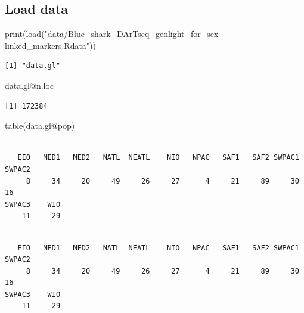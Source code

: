 \documentclass[
  letterpaper,
  DIV=11,
  numbers=noendperiod]{scrreprt}
\newenvironment{Shaded}{\begin{snugshade}}{\end{snugshade}}
\newcommand{\FunctionTok}[1]{\textcolor[rgb]{0.02,0.16,0.49}{#1}}
\newcommand{\NormalTok}[1]{\textcolor[rgb]{0.00,0.44,0.13}{#1}}
\newcommand{\SpecialCharTok}[1]{\textcolor[rgb]{0.25,0.44,0.63}{#1}}
\newcommand{\StringTok}[1]{\textcolor[rgb]{0.25,0.44,0.63}{#1}}
\begin{document}
\hypertarget{load-data-4}{%
\subsection*{Load data}\label{load-data-4}}

\begin{Shaded}
\begin{Highlighting}[]
\FunctionTok{print}\NormalTok{(}\FunctionTok{load}\NormalTok{(}\StringTok{"data/Blue\_shark\_DArTseq\_genlight\_for\_sex{-}linked\_markers.Rdata"}\NormalTok{))}
\end{Highlighting}
\end{Shaded}

\begin{verbatim}
[1] "data.gl"
\end{verbatim}

\begin{Shaded}
\begin{Highlighting}[]
\NormalTok{data.gl}\SpecialCharTok{@}\NormalTok{n.loc}
\end{Highlighting}
\end{Shaded}

\begin{verbatim}
[1] 172384
\end{verbatim}

\begin{Shaded}
\begin{Highlighting}[]
\FunctionTok{table}\NormalTok{(data.gl}\SpecialCharTok{@}\NormalTok{pop)}
\end{Highlighting}
\end{Shaded}

\begin{verbatim}

   EIO   MED1   MED2   NATL  NEATL    NIO   NPAC   SAF1   SAF2 SWPAC1 SWPAC2 
     8     34     20     49     26     27      4     21     89     30     16 
SWPAC3    WIO 
    11     29 
\end{verbatim}

\begin{Shaded}
\end{Shaded}

\begin{verbatim}

   EIO   MED1   MED2   NATL  NEATL    NIO   NPAC   SAF1   SAF2 SWPAC1 SWPAC2 
     8     34     20     49     26     27      4     21     89     30     16 
SWPAC3    WIO 
    11     29 
\end{verbatim}
\end{document}
